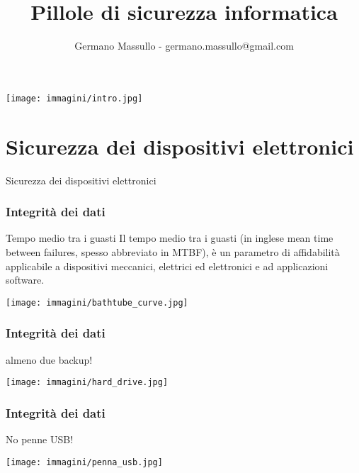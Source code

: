 \documentclass[italian,aspectratio=169]{beamer}
\author{Germano Massullo - germano.massullo@gmail.com}
\date{}
\title{Pillole di sicurezza informatica}
\begin{document}
\begin{frame}
 \maketitle
  \vspace{-2.5cm}
   \begin{center}
   \texttt{[image: immagini/intro.jpg]}
   \end{center}
\end{frame}

\begin{frame}
 \tableofcontents{}
\end{frame}

\section{Sicurezza dei dispositivi elettronici}
\begin{frame}
 \begin{center}
  \huge Sicurezza dei dispositivi elettronici
 \end{center}
\end{frame}

\begin{frame}
 \frametitle{Integrità dei dati}
 \begin{block}{Tempo medio tra i guasti}
  Il tempo medio tra i guasti (in inglese mean time between failures,
  spesso abbreviato in MTBF), è un parametro di affidabilità applicabile a
  dispositivi meccanici, elettrici ed elettronici e ad applicazioni software.
 \end{block}
 \begin{center}
   \texttt{[image: immagini/bathtube\_curve.jpg]}
 \end{center}
\end{frame}


\begin{frame}
 \frametitle{Integrità dei dati}
 \begin{center}
   \huge almeno due backup!
 \end{center}
 \begin{center}
   \texttt{[image: immagini/hard\_drive.jpg]}
 \end{center}
\end{frame}

\begin{frame}
 \frametitle{Integrità dei dati}
 \begin{center}
   \huge No penne USB!
 \end{center}
 \begin{center}
   \texttt{[image: immagini/penna\_usb.jpg]}
 \end{center}
\end{frame}
\end{document}
